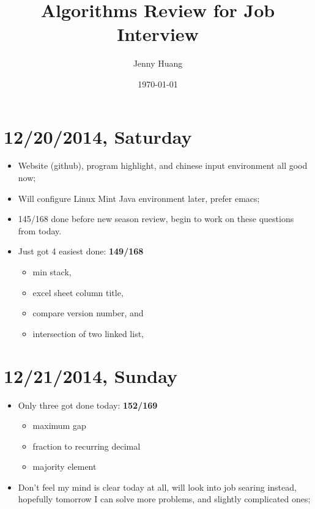 \documentclass[9pt,b5paper]{article}
\author{Jenny Huang}
\date{\today}
\title{Algorithms Review for Job Interview}
\begin{document}
\maketitle
\tableofcontents


\section{12/20/2014, Saturday}
\label{sec-1}
\begin{itemize}
\item Website (github), program highlight, and chinese input environment all good now;
\item Will configure Linux Mint Java environment later, prefer emacs;
\item 145/168 done before new season review, begin to work on these questions from today.
\item Just got 4 easiest done: \textbf{149/168}
\begin{itemize}
\item min stack,
\item excel sheet column title,
\item compare version number, and
\item intersection of two linked list,
\end{itemize}
\end{itemize}
\section{12/21/2014, Sunday}
\label{sec-2}
\begin{itemize}
\item Only three got done today: \textbf{152/169}
\begin{itemize}
\item maximum gap
\item fraction to recurring decimal
\item majority element
\end{itemize}
\item Don't feel my mind is clear today at all, will look into job searing instead, hopefully tomorrow I can solve more problems, and slightly complicated ones;
\end{itemize}
\end{document}
